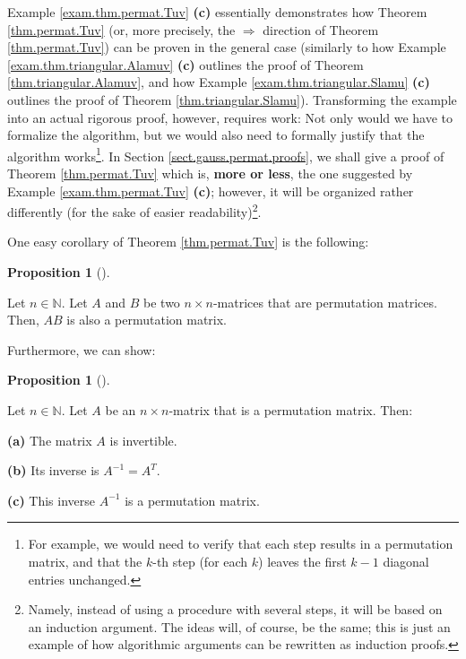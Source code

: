 \documentclass[numbers=enddot,12pt,final,onecolumn,notitlepage]{scrartcl}%
\theoremstyle{definition}
\newtheorem{prop}[theo]{Proposition}
\newenvironment{proposition}[1][]
{\begin{prop}[#1]\begin{leftbar}}
{\end{leftbar}\end{prop}}
\begin{document}
Example \ref{exam.thm.permat.Tuv} \textbf{(c)} essentially demonstrates how
Theorem \ref{thm.permat.Tuv} (or, more precisely, the $\Longrightarrow$
direction of Theorem \ref{thm.permat.Tuv}) can be proven in the general case
(similarly to how Example \ref{exam.thm.triangular.Alamuv} \textbf{(c)}
outlines the proof of Theorem \ref{thm.triangular.Alamuv}, and how Example
\ref{exam.thm.triangular.Slamu} \textbf{(c)} outlines the proof of Theorem
\ref{thm.triangular.Slamu}). Transforming the example into an actual rigorous
proof, however, requires work: Not only would we have to formalize the
algorithm, but we would also need to formally justify that the algorithm
works\footnote{For example, we would need to verify that each step results in
a permutation matrix, and that the $k$-th step (for each $k$) leaves the first
$k-1$ diagonal entries unchanged.}. In Section \ref{sect.gauss.permat.proofs},
we shall give a proof of Theorem \ref{thm.permat.Tuv} which is, \textbf{more
or less}, the one suggested by Example \ref{exam.thm.permat.Tuv} \textbf{(c)};
however, it will be organized rather differently (for the sake of easier
readability)\footnote{Namely, instead of using a procedure with several steps,
it will be based on an induction argument. The ideas will, of course, be the
same; this is just an example of how algorithmic arguments can be rewritten as
induction proofs.}.

One easy corollary of Theorem \ref{thm.permat.Tuv} is the following:

\begin{proposition}
\label{prop.permat.AB}Let $n\in\mathbb{N}$. Let $A$ and $B$ be two $n\times
n$-matrices that are permutation matrices. Then, $AB$ is also a permutation matrix.
\end{proposition}

Furthermore, we can show:

\begin{proposition}
\label{prop.permat.inverse}Let $n\in\mathbb{N}$. Let $A$ be an $n\times
n$-matrix that is a permutation matrix. Then:

\textbf{(a)} The matrix $A$ is invertible.

\textbf{(b)} Its inverse is $A^{-1}=A^{T}$.

\textbf{(c)} This inverse $A^{-1}$ is a permutation matrix.
\end{proposition}
\end{document}
